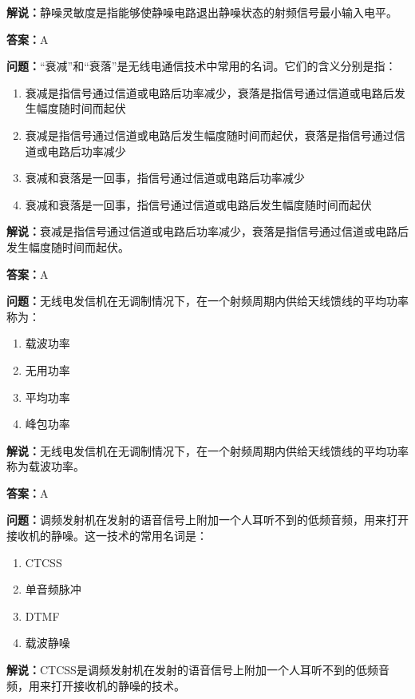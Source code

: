 \textbf{解说：}静噪灵敏度是指能够使静噪电路退出静噪状态的射频信号最小输入电平。%

\textbf{答案：}A

\textbf{问题：}“衰减”和“衰落”是无线电通信技术中常用的名词。它们的含义分别是指：

\begin{enumerate}[label=\Alph*), leftmargin=3em]
	\item 衰减是指信号通过信道或电路后功率减少，衰落是指信号通过信道或电路后发生幅度随时间而起伏
	\item 衰减是指信号通过信道或电路后发生幅度随时间而起伏，衰落是指信号通过信道或电路后功率减少
	\item 衰减和衰落是一回事，指信号通过信道或电路后功率减少
	\item 衰减和衰落是一回事，指信号通过信道或电路后发生幅度随时间而起伏
\end{enumerate}

\textbf{解说：}衰减是指信号通过信道或电路后功率减少，衰落是指信号通过信道或电路后发生幅度随时间而起伏。%

\textbf{答案：}A

\textbf{问题：}无线电发信机在无调制情况下，在一个射频周期内供给天线馈线的平均功率称为：

\begin{enumerate}[label=\Alph*), leftmargin=3em]
	\item 载波功率
	\item 无用功率
	\item 平均功率
	\item 峰包功率
\end{enumerate}

\textbf{解说：}无线电发信机在无调制情况下，在一个射频周期内供给天线馈线的平均功率称为载波功率。%

\textbf{答案：}A

\textbf{问题：}调频发射机在发射的语音信号上附加一个人耳听不到的低频音频，用来打开接收机的静噪。这一技术的常用名词是：

\begin{enumerate}[label=\Alph*), leftmargin=3em]
	\item CTCSS
	\item 单音频脉冲
	\item DTMF
	\item 载波静噪
\end{enumerate}

\textbf{解说：}CTCSS是调频发射机在发射的语音信号上附加一个人耳听不到的低频音频，用来打开接收机的静噪的技术。%

